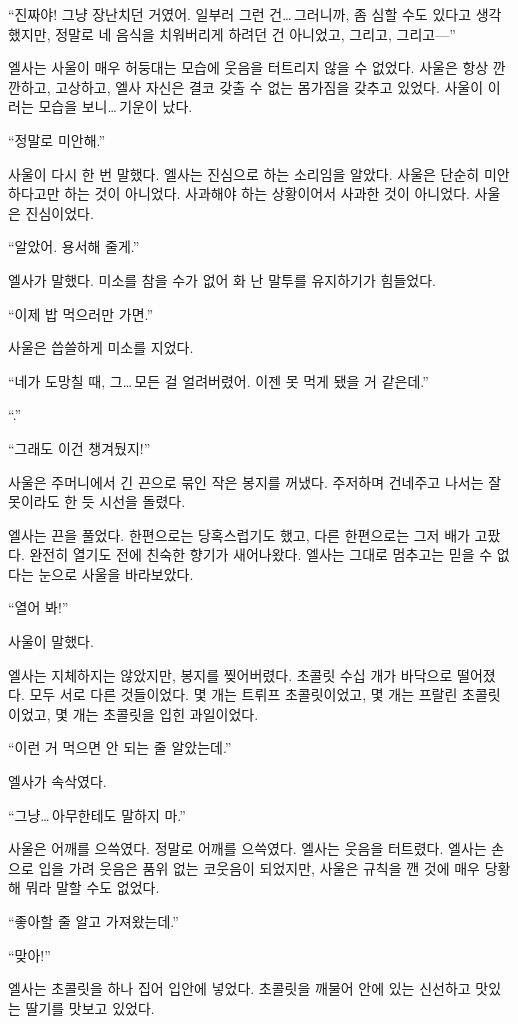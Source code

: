 ``진짜야! 그냥 장난치던 거였어. 일부러 그런 건\ldots\,그러니까, 좀 심할 수도 있다고 생각했지만, 정말로 네 음식을 치워버리게 하려던 건 아니었고, 그리고, 그리고—''

엘사는 사울이 매우 허둥대는 모습에 웃음을 터트리지 않을 수 없었다. 사울은 항상 깐깐하고, 고상하고, 엘사 자신은 결코 갖출 수 없는 몸가짐을 갖추고 있었다. 사울이 이러는 모습을 보니\ldots\,기운이 났다.

``정말로 미안해.''

사울이 다시 한 번 말했다. 엘사는 진심으로 하는 소리임을 알았다. 사울은 단순히 미안하다고만 하는 것이 아니었다. 사과해야 하는 상황이어서 사과한 것이 아니었다. 사울은 진심이었다.

``알았어. 용서해 줄게.''

엘사가 말했다. 미소를 참을 수가 없어 화 난 말투를 유지하기가 힘들었다.

``이제 밥 먹으러만 가면.''

사울은 씁쓸하게 미소를 지었다.

``네가 도망칠 때, 그\ldots\,모든 걸 얼려버렸어. 이젠 못 먹게 됐을 거 같은데.''

``.''

``그래도 이건 챙겨뒀지!''

사울은 주머니에서 긴 끈으로 묶인 작은 봉지를 꺼냈다. 주저하며 건네주고 나서는 잘못이라도 한 듯 시선을 돌렸다.

엘사는 끈을 풀었다. 한편으로는 당혹스럽기도 했고, 다른 한편으로는 그저 배가 고팠다. 완전히 열기도 전에 친숙한 향기가 새어나왔다. 엘사는 그대로 멈추고는 믿을 수 없다는 눈으로 사울을 바라보았다.

``열어 봐!''

사울이 말했다.

엘사는 지체하지는 않았지만, 봉지를 찢어버렸다. 초콜릿 수십 개가 바닥으로 떨어졌다. 모두 서로 다른 것들이었다. 몇 개는 트뤼프 초콜릿이었고, 몇 개는 프랄린 초콜릿이었고, 몇 개는 초콜릿을 입힌 과일이었다.

``이런 거 먹으면 안 되는 줄 알았는데.''

엘사가 속삭였다.

``그냥\ldots\,아무한테도 말하지 마.''

사울은 어깨를 으쓱였다. 정말로 어깨를 으쓱였다. 엘사는 웃음을 터트렸다. 엘사는 손으로 입을 가려 웃음은 품위 없는 코웃음이 되었지만, 사울은 규칙을 깬 것에 매우 당황해 뭐라 말할 수도 없었다.

``좋아할 줄 알고 가져왔는데.''

``맞아!''

엘사는 초콜릿을 하나 집어 입안에 넣었다. 초콜릿을 깨물어 안에 있는 신선하고 맛있는 딸기를 맛보고 있었다.

